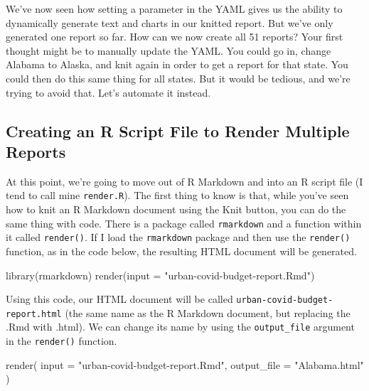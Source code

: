 \documentclass[
]{book}
\newenvironment{Shaded}{\begin{snugshade}}{\end{snugshade}}
\newcommand{\AttributeTok}[1]{\textcolor[rgb]{0.77,0.63,0.00}{#1}}
\newcommand{\FunctionTok}[1]{\textcolor[rgb]{0.00,0.00,0.00}{#1}}
\newcommand{\NormalTok}[1]{#1}
\newcommand{\StringTok}[1]{\textcolor[rgb]{0.31,0.60,0.02}{#1}}
\begin{document}
We've now seen how setting a parameter in the YAML gives us the ability to dynamically generate text and charts in our knitted report. But we've only generated one report so far. How can we now create all 51 reports? Your first thought might be to manually update the YAML. You could go in, change Alabama to Alaska, and knit again in order to get a report for that state. You could then do this same thing for all states. But it would be tedious, and we're trying to avoid that. Let's automate it instead.

\hypertarget{creating-an-r-script-file-to-render-multiple-reports}{%
\subsection*{Creating an R Script File to Render Multiple Reports}\label{creating-an-r-script-file-to-render-multiple-reports}}

At this point, we're going to move out of R Markdown and into an R script file (I tend to call mine \texttt{render.R}). The first thing to know is that, while you've seen how to knit an R Markdown document using the Knit button, you can do the same thing with code. There is a package called \texttt{rmarkdown} and a function within it called \texttt{render()}. If I load the \texttt{rmarkdown} package and then use the \texttt{render()} function, as in the code below, the resulting HTML document will be generated.

\begin{Shaded}
\begin{Highlighting}[]
\FunctionTok{library}\NormalTok{(rmarkdown)}
\FunctionTok{render}\NormalTok{(}\AttributeTok{input =} \StringTok{"urban{-}covid{-}budget{-}report.Rmd"}\NormalTok{)}
\end{Highlighting}
\end{Shaded}

Using this code, our HTML document will be called \texttt{urban-covid-budget-report.html} (the same name as the R Markdown document, but replacing the .Rmd with .html). We can change its name by using the \texttt{output\_file} argument in the \texttt{render()} function.

\begin{Shaded}
\begin{Highlighting}[]
\FunctionTok{render}\NormalTok{(}
\AttributeTok{input =} \StringTok{"urban{-}covid{-}budget{-}report.Rmd"}\NormalTok{,}
\AttributeTok{output\_file =} \StringTok{"Alabama.html"}
\NormalTok{)}
\end{Highlighting}
\end{Shaded}
\end{document}
